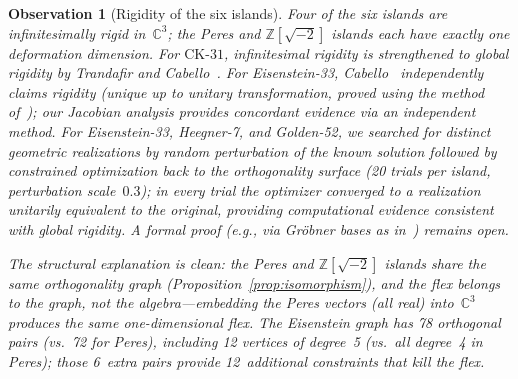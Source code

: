 \documentclass[12pt,a4paper]{article}
\newtheorem{observation}[theorem]{Observation}
\newcommand{\C}{\mathbb{C}}
\newcommand{\Z}{\mathbb{Z}}
\newcommand{\CK}{\mathrm{CK}\text{-}31}
\begin{document}
\begin{observation}[Rigidity of the six islands]
Four of the six islands are infinitesimally rigid in~$\C^3$; the Peres and $\Z[\sqrt{-2}]$ islands each have exactly one deformation dimension.  For $\CK$, infinitesimal rigidity is strengthened to global rigidity by Trandafir and Cabello~\cite{TrandafirCabello2025}.  For Eisenstein-33, Cabello~\cite{Cabello2025simplest} independently claims rigidity (unique up to unitary transformation, proved using the method of~\cite{TrandafirCabello2025}); our Jacobian analysis provides concordant evidence via an independent method.  For Eisenstein-33, Heegner-7, and Golden-52, we searched for distinct geometric realizations by random perturbation of the known solution followed by constrained optimization back to the orthogonality surface (20 trials per island, perturbation scale~$0.3$); in every trial the optimizer converged to a realization unitarily equivalent to the original, providing computational evidence consistent with global rigidity.  A formal proof (e.g., via Gr\"obner bases as in~\cite{TrandafirCabello2025}) remains open.

The structural explanation is clean: the Peres and $\Z[\sqrt{-2}]$ islands share the same orthogonality graph (Proposition~\ref{prop:isomorphism}), and the flex belongs to the \emph{graph}, not the algebra---embedding the Peres vectors (all real) into~$\C^3$ produces the same one-dimensional flex.  The Eisenstein graph has 78 orthogonal pairs (vs.\ 72 for Peres), including 12 vertices of degree~5 (vs.\ all degree~4 in Peres); those 6~extra pairs provide 12~additional constraints that kill the flex.


\end{observation}
\end{document}
